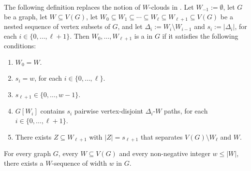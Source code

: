 \documentclass{patmorin}
\newcommand{\pat}[1]{\textcolor{Blue}{[Pat: #1]}}
\newcommand{\hussein}[1]{\textcolor{purple}{HH: #1}}
\begin{document}
The following definition replaces the notion of $W$-clouds in \cite{dvorak.norin:treewidth}.
Let $W_{-1}:=\emptyset$, let $G$ be a graph, let $W\subseteq V(G)$, let $W_0\subseteq W_1\subseteq\cdots\subseteq W_{\ell}\subseteq W_{\ell+1}\subseteq V(G)$ be a nested sequence of vertex subsets of $G$, and let $\Delta_i:=W_{i}\setminus W_{i-1}$ and $s_i:=|\Delta_i|$, for each $i\in\{0,\ldots,\ell+1\}$.  Then $W_0,\ldots,W_{\ell+1}$ is a  in $G$ if it satisfies the following conditions:
\begin{enumerate}[nosep,nolistsep,label=\rm(\alph*),ref=(\alph*)]
  \item $W_0=W$.\label{w_starts}
  \item $s_i=w$, for each $i\in\{0,\ldots,\ell\}$.\label{uniform_size}
  \item $s_{\ell+1}\in\{0,\ldots,w-1\}$.\label{remainder}
  \item $G[W_i]$ contains $s_i$  pairwise vertex-disjoint $\Delta_i$-$W$ paths, for each $i\in\{0,\ldots,\ell+1\}$.\label{linked}
  \item There exists $Z\subseteq W_{\ell+1}$ with $|Z|=s_{\ell+1}$ that separates $V(G)\setminus W_{\ell}$ and $W$. \label{separated}
\end{enumerate}



\begin{lem}\label{w_sequence}
  For every graph $G$, every $W\subseteq V(G)$ and every non-negative integer $w\le |W|$, there exists a $W$-sequence of width $w$ in $G$.
\end{lem}
\end{document}
